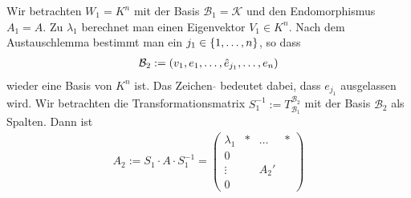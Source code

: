 \vspace{1\baselineskip}



\vspace{1\baselineskip}

 \normalsize

\vspace{1\baselineskip}


Wir betrachten $W_1 = K^n$ mit der Basis $\mathcal{B}_1 = \mathcal{K}$ und den
Endomorphismus $A_1 = A$. Zu $\lambda_1$ berechnet man einen Eigenvektor $V_1 \in K^n$.
Nach dem Austauschlemma bestimmt man ein $j_1 \in \left\{ 1,\dots,n \right\}$, so
dass
\begin{align*}
    \mathcal{B}_2 := \left( v_1 , e_1 , \dots , \hat{e}_{j_1} , \dots , e_n \right)
\end{align*}
wieder eine Basis von $K^n$ ist. Das Zeichen $\hat{}$ bedeutet dabei, dass $e_{j_1}$
ausgelassen wird. Wir betrachten die Transformationsmatrix $S_1^{-1} := T_{\mathcal{B}_1}^{\mathcal{B}_2}$
mit der Basis $\mathcal{B}_2$ als Spalten. Dann ist
\begin{align*}
    A_2 := S_1 \cdot A \cdot S_1^{-1} = \begin{pmatrix}
        \lambda_1 & * & \dots & * \\
        0 & & & \\
        \vdots & & A_2' & \\
        0 & & & 
    \end{pmatrix}
\end{align*}

